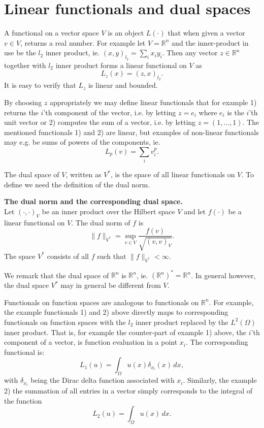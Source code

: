 \section{Linear functionals and dual spaces}

A functional on a vector space $V$ is an object $L(\cdot)$ that when given a
vector $v\in V$, returns a real number. 
For example let $V=\mathbb{R}^n$ and the inner-product in use be 
the $l_2$ inner product, ie.  $(x, y)_{l_2} = \sum_i x_i y_i$. 
Then any vector $z\in \mathbb{R}^n$ together
with $l_2$ inner product forms a linear functional on $V$ as
\[
L_z(x)  = (z, x)_{l_2} .  
\]
It is easy to verify that $L_z$ is linear and bounded. 

By choosing $z$ appropriately we may define linear functionals
that for example 1) returns the $i$'th component of the vector, i.e. by letting $z=e_i$ where
$e_i$ is the $i$'th unit vector or 2) computes the sum of a vector, i.e. by letting $z=(1,\ldots, 1)$. 
The mentioned functionals 1) and 2) are linear, but examples of non-linear functionals may e.g. be
sums of powers of the components, ie.  
\[
L_p (v) = \sum_i v_i^p. 
\]

The dual space of $V$, written as $V^*$,  is the space of all linear functionals on $V$. 
To define we need the definition of the dual norm. 

\begin{defin}{\textbf{The dual norm and the corresponding dual space.}} \\
\label{dualnorm}
\noindent
Let $(\cdot, \cdot)_V$ be an inner product over the Hilbert
space $V$ and let $f(\cdot)$ be a linear functional on $V$.   
The dual norm of $f$ is 
\[
	\|f\|_{V^*} = \sup_{v\in V} \frac{f(v)}{\sqrt{(v,v)_V}} .    
\]
The space $V^*$ consists of all $f$ such that $\|f\|_{V^*} < \infty$.  
\end{defin}

We remark that the dual space of $\mathbb{R}^n$ is $\mathbb{R}^n$, ie. $(\mathbb{R}^n)^* = \mathbb{R}^n$. 
In general however, the dual space $V^*$ may in general be different from $V$.   

Functionals on function spaces are analogous to functionals on $\mathbb{R}^n$. For example, the
example functionals 1) and 2) above directly maps to corresponding functionals on function spaces
with the $l_2$ inner product replaced by the $L^2(\Omega)$ inner product. 
That is, for example the counter-part of example 1) above, the $i$'th component of a vector, is function evaluation in a point $x_i$.  
The corresponding functional is: 
\[
L_1 (u)  = \int_\Omega u (x) \delta_{x_i} (x) \, dx   , 
\]
with $\delta_{x_i}$ being the Dirac delta function associated with $x_i$.  Similarly, the example 2) 
the summation of all entries in a vector simply corresponds to the integral of the function 
\[
L_2 (u)  = \int_\Omega u (x)  \, dx   .  
\]


